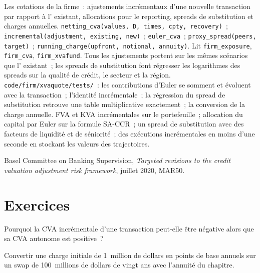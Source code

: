 \begin{build}
 Les cotations  de la firme~: ajustements incrémentaux d'une nouvelle transaction par rapport à
l' existant, allocations pour le reporting, spreads de substitution et charges annuelles.
 \texttt{netting\_cva(values, D, times, cpty, recovery)}~;
\texttt{incremental(adjustment, existing, new)}~; \texttt{euler\_cva}~; \texttt{proxy\_spread(peers,
target)}~; \texttt{running\_charge(upfront, notional, annuity)}. Lit \texttt{firm\_exposure},
\texttt{firm\_cva}, \texttt{firm\_xvafund}.
 Tous les ajustements portent sur les mêmes scénarios que l' existant~; les spreads de substitution
font régresser les logarithmes des spreads sur la qualité de crédit, le secteur et la région.
 \texttt{code/firm/xvaquote/tests/}~: les contributions d'Euler se somment et
évoluent avec la transaction~; l'identité incrémentale~; la régression du spread de substitution retrouve une
table multiplicative exactement~; la conversion de la charge annuelle.
 FVA et KVA incrémentales sur le portefeuille~; allocation du capital par Euler sur
la formule SA-CCR~; un spread de substitution avec des facteurs de liquidité et de séniorité~; des exécutions incrémentales
en moins d'une seconde en stockant les valeurs des trajectoires.
\end{build}

\begin{omsources}
\item Basel Committee on Banking Supervision, \emph{Targeted revisions to the credit valuation
adjustment risk framework}, juillet 2020, MAR50.
\end{omsources}

\section{Exercices}

\begin{exercise}[$\star$]\label{exo:rc:the-valuation-adjustment-desk:1}
Pourquoi la CVA incrémentale d'une transaction peut-elle être négative alors que sa CVA autonome est positive~?
\end{exercise}

\begin{exercise}[$\star$]\label{exo:rc:the-valuation-adjustment-desk:2}
Convertir une charge initiale de 1~million de dollars en points de base annuels sur un swap de 100~millions de dollars
de vingt ans avec l'annuité du chapitre.
\end{exercise}

